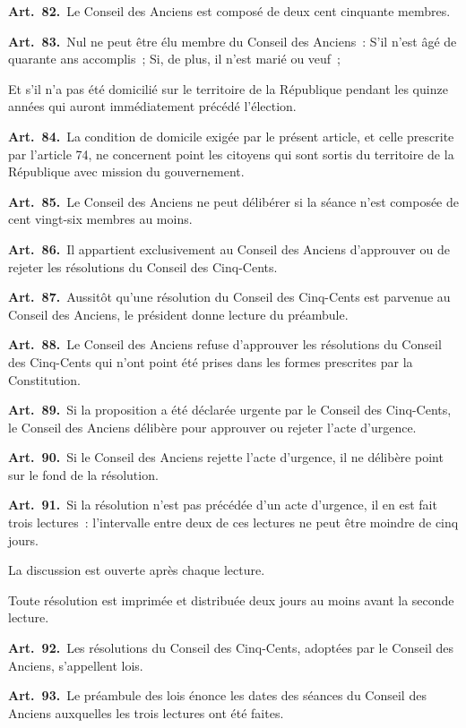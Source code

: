 \documentclass[french,twoside]{book} %
\newcommand{\labelchar}[1]{\textbf{\color{rubric} #1}}
\begin{document}
\labelchar{Art. 82.} Le Conseil des Anciens est composé de deux cent cinquante membres.\par
\labelchar{Art. 83.} Nul ne peut être élu membre du Conseil des Anciens : S’il n’est âgé de quarante ans accomplis ; Si, de plus, il n’est marié ou veuf ;\par
Et s’il n’a pas été domicilié sur le territoire de la République pendant les quinze années qui auront immédiatement précédé l’élection.\par
\labelchar{Art. 84.} La condition de domicile exigée par le présent article, et celle prescrite par l’article 74, ne concernent point les citoyens qui sont sortis du territoire de la République avec mission du gouvernement.\par
\labelchar{Art. 85.} Le Conseil des Anciens ne peut délibérer si la séance n’est composée de cent vingt-six membres au moins.\par
\labelchar{Art. 86.} Il appartient exclusivement au Conseil des Anciens d’approuver ou de rejeter les résolutions du Conseil des Cinq-Cents.\par
\labelchar{Art. 87.} Aussitôt qu’une résolution du Conseil des Cinq-Cents est parvenue au Conseil des Anciens, le président donne lecture du préambule.\par
\labelchar{Art. 88.} Le Conseil des Anciens refuse d’approuver les résolutions du Conseil des Cinq-Cents qui n’ont point été prises dans les formes prescrites par la Constitution.\par
\labelchar{Art. 89.} Si la proposition a été déclarée urgente par le Conseil des Cinq-Cents, le Conseil des Anciens délibère pour approuver ou rejeter l’acte d’urgence.\par
\labelchar{Art. 90.} Si le Conseil des Anciens rejette l’acte d’urgence, il ne délibère point sur le fond de la résolution.\par
\labelchar{Art. 91.} Si la résolution n’est pas précédée d’un acte d’urgence, il en est fait trois lectures : l’intervalle entre deux de ces lectures ne peut être moindre de cinq jours.\par
La discussion est ouverte après chaque lecture.\par
Toute résolution est imprimée et distribuée deux jours au moins avant la seconde lecture.\par
\labelchar{Art. 92.} Les résolutions du Conseil des Cinq-Cents, adoptées par le Conseil des Anciens, s’appellent lois.\par
\labelchar{Art. 93.} Le préambule des lois énonce les dates des séances du Conseil des Anciens auxquelles les trois lectures ont été faites.\par
\end{document}
